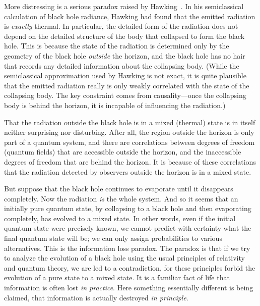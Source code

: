 More distressing is a serious paradox raised by Hawking~\hawkA.  In his
semiclassical
calculation of black hole radiance, Hawking had found that the emitted
radiation is {\it exactly} thermal.  In particular, the detailed form of the
radiation does not depend on the detailed structure of the body that collapsed
to form the black hole.  This is because the state of the radiation is
determined only by the geometry of the black hole {\it outside} the horizon,
and the black hole has no hair that records any detailed information about the
collapsing body.  (While the semiclassical approximation used by Hawking is not
exact, it is quite plausible that the emitted radiation really is only weakly
correlated with the state of the collapsing body.  The key constraint comes
from causality---once the collapsing body is behind the horizon, it is
incapable of influencing the radiation.\lref{})

That the radiation outside the black hole is in a mixed (thermal) state is in
itself neither surprising nor disturbing.  After all, the region outside the
horizon is only part of a quantum system, and there are correlations between
degrees of freedom (quantum fields) that are accessible outside the horizon,
and
the inaccessible degrees of freedom that are behind the horizon.  It is because
of these correlations that the radiation detected by observers outside the
horizon is in a mixed state.

But suppose that the black hole continues to evaporate until it disappears
completely.  Now the radiation {\it is} the whole system.  And so it seems that
 an initially pure quantum state, by collapsing to a black hole and then
evaporating completely, has evolved to a mixed state.  In other words, even if
the initial quantum state were precisely known, we cannot predict with
certainty what the final quantum state will be; we can only assign
probabilities to various alternatives.  This is the information loss paradox.
The paradox is that if we try to analyze the evolution of a black hole using
the usual principles of relativity and quantum theory, we are led to a
contradiction, for these principles forbid the evolution of a pure state to a
mixed state.
It is a familiar fact of life that information is often lost {\it in
practice}.\lref{}
Here something essentially different is being claimed, that information is
actually destroyed {\it in principle}.

